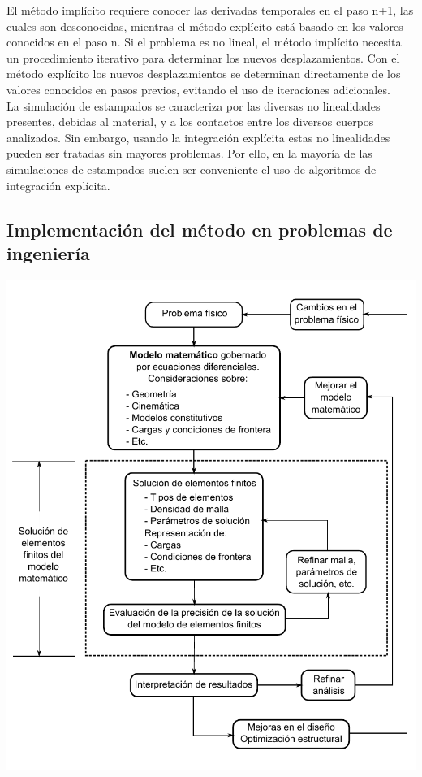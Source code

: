 El método implícito requiere conocer las derivadas temporales en el paso n+1, las cuales son desconocidas, 
mientras el método explícito está basado en los valores conocidos en el paso n. Si el problema es no 
lineal, el método implícito necesita un procedimiento iterativo para determinar los nuevos desplazamientos. 
Con el método explícito los nuevos desplazamientos se determinan directamente de los valores conocidos 
en pasos previos, evitando el uso de iteraciones adicionales.~\cite{nielsen1997}\\

La simulación de estampados se caracteriza por las diversas no linealidades presentes, debidas al 
material, y a los contactos entre los diversos cuerpos analizados. Sin embargo, usando la integración 
explícita estas no linealidades pueden ser tratadas sin mayores problemas. Por ello, en la mayoría de 
las simulaciones de estampados suelen ser conveniente el uso de algoritmos de integración explícita.


\subsection{Implementación del método en problemas de ingeniería}

\begin{center}
\includegraphics[scale=0.85]{src/ch2/elemento_finito_diagrama}
\label{fig:fem_diagram}
\end{center}

